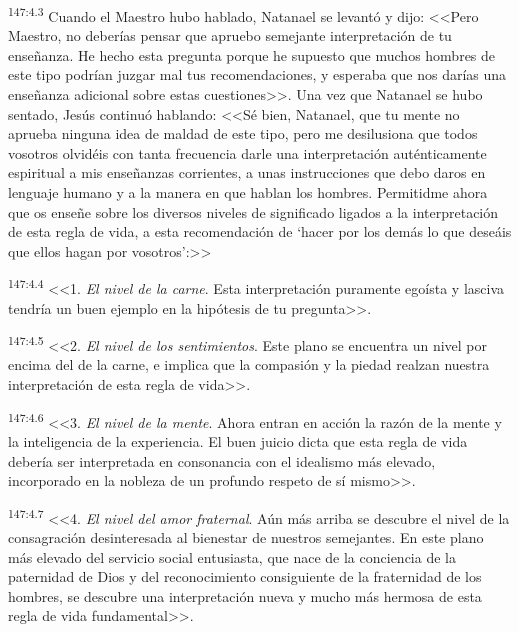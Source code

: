 \par 
\textsuperscript{147:4.3} Cuando el Maestro hubo hablado, Natanael se levantó y dijo: <<Pero Maestro, no deberías pensar que apruebo semejante interpretación de tu enseñanza. He hecho esta pregunta porque he supuesto que muchos hombres de este tipo podrían juzgar mal tus recomendaciones, y esperaba que nos darías una enseñanza adicional sobre estas cuestiones>>. Una vez que Natanael se hubo sentado, Jesús continuó hablando: <<Sé bien, Natanael, que tu mente no aprueba ninguna idea de maldad de este tipo, pero me desilusiona que todos vosotros olvidéis con tanta frecuencia darle una interpretación auténticamente espiritual a mis enseñanzas corrientes, a unas instrucciones que debo daros en lenguaje humano y a la manera en que hablan los hombres. Permitidme ahora que os enseñe sobre los diversos niveles de significado ligados a la interpretación de esta regla de vida, a esta recomendación de `hacer por los demás lo que deseáis que ellos hagan por vosotros':>>

\par 
\textsuperscript{147:4.4} <<1. \textit{El nivel de la carne}. Esta interpretación puramente egoísta y lasciva tendría un buen ejemplo en la hipótesis de tu pregunta>>.

\par 
\textsuperscript{147:4.5} <<2. \textit{El nivel de los sentimientos}. Este plano se encuentra un nivel por encima del de la carne, e implica que la compasión y la piedad realzan nuestra interpretación de esta regla de vida>>.

\par 
\textsuperscript{147:4.6} <<3. \textit{El nivel de la mente}. Ahora entran en acción la razón de la mente y la inteligencia de la experiencia. El buen juicio dicta que esta regla de vida debería ser interpretada en consonancia con el idealismo más elevado, incorporado en la nobleza de un profundo respeto de sí mismo>>.

\par 
\textsuperscript{147:4.7} <<4. \textit{El nivel del amor fraternal}. Aún más arriba se descubre el nivel de la consagración desinteresada al bienestar de nuestros semejantes. En este plano más elevado del servicio social entusiasta, que nace de la conciencia de la paternidad de Dios y del reconocimiento consiguiente de la fraternidad de los hombres, se descubre una interpretación nueva y mucho más hermosa de esta regla de vida fundamental>>.

